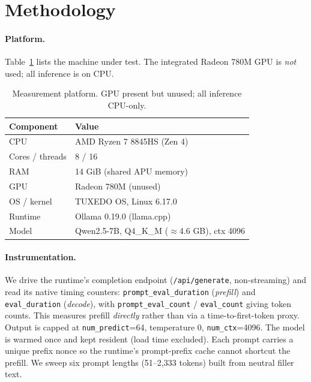 \documentclass[10pt,twocolumn]{article}
\begin{document}
\section{Methodology}
\label{sec:method}

\paragraph{Platform.}
Table~\ref{tab:hardware} lists the machine under test. The integrated
Radeon 780M GPU is \emph{not} used; all inference is on CPU.

\begin{table}[t]
  \centering
  \caption{Measurement platform. GPU present but unused; all inference CPU-only.}
  \label{tab:hardware}
  \begin{tabular}{ll}
    \toprule
    Component & Value \\
    \midrule
    CPU            & AMD Ryzen 7 8845HS (Zen 4) \\
    Cores / threads& 8 / 16 \\
    RAM            & 14 GiB (shared APU memory) \\
    GPU            & Radeon 780M (unused) \\
    OS / kernel    & TUXEDO OS, Linux 6.17.0 \\
    Runtime        & Ollama 0.19.0 (llama.cpp) \\
    Model          & Qwen2.5-7B, Q4\_K\_M ($\approx$4.6 GB), ctx 4096 \\
    \bottomrule
  \end{tabular}
\end{table}

\paragraph{Instrumentation.}
We drive the runtime's completion endpoint (\texttt{/api/generate},
non-streaming) and read its native timing counters:
\texttt{prompt\_eval\_duration} (\emph{prefill}) and \texttt{eval\_duration}
(\emph{decode}), with \texttt{prompt\_eval\_count} / \texttt{eval\_count}
giving token counts. This measures prefill \emph{directly} rather than via
a time-to-first-token proxy. Output is capped at \texttt{num\_predict}=64,
temperature 0, \texttt{num\_ctx}=4096. The model is warmed once and kept
resident (load time excluded). Each prompt carries a unique prefix nonce so
the runtime's prompt-prefix cache cannot shortcut the prefill. We sweep six
prompt lengths (51--2{,}333 tokens) built from neutral filler text.
\end{document}
